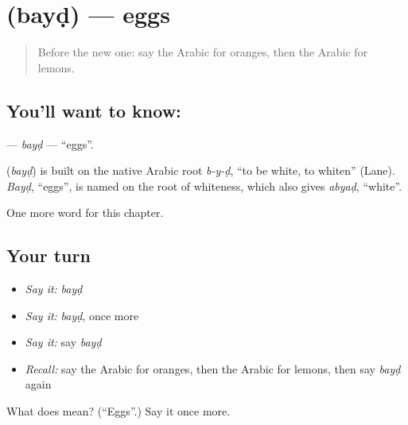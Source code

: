 \section[\texorpdfstring{\ar{بيض} (bayḍ)}{بيض (bayḍ)}]{ (bayḍ) — eggs}

\label{lesson:AR-C68-bayd}



\begin{quote}
Before the new one: say the Arabic for oranges, then the Arabic for lemons.
\end{quote}

\subsection*{You'll want to know: }
\textbf{} — \emph{bayḍ} — \textquotedblleft{}eggs\textquotedblright{}.

\begin{cousinweb}
\textbf{} (\emph{bayḍ}) is built on the native Arabic root \emph{b-y-ḍ}, \textquotedblleft{}to be white, to whiten\textquotedblright{} (Lane). \emph{Bayḍ}, \textquotedblleft{}eggs\textquotedblright{}, is named on the root of whiteness, which also gives \emph{abyaḍ}, \textquotedblleft{}white\textquotedblright{}.
\end{cousinweb}

\begin{grammarlens}[title={What you've built}]
One more word for this chapter.
\end{grammarlens}

\subsection*{Your turn}
\begin{itemize}
\raggedright
  \item \emph{Say it:} \emph{bayḍ}
  \item \emph{Say it:} \emph{bayḍ}, once more
  \item \emph{Say it:} say \emph{bayḍ}
  \item \emph{Recall:} say the Arabic for oranges, then the Arabic for lemons, then say \emph{bayḍ} again
\end{itemize}

\begin{tcolorbox}[breakable,colback=teal!4,colframe=teal!35!black,title={Before you move on}]
What does  mean? (\textquotedblleft{}Eggs\textquotedblright{}.) Say it once more.
\end{tcolorbox}
